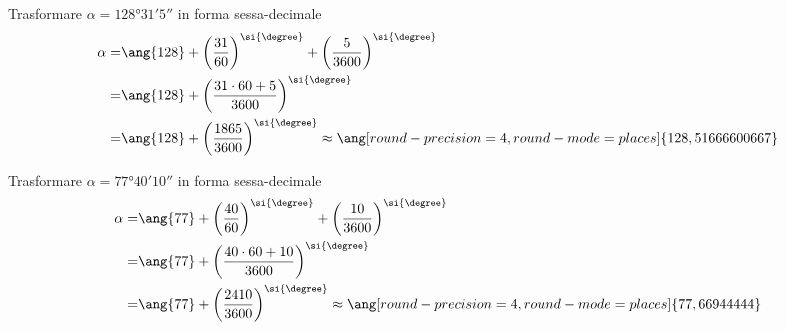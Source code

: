   \begin{exercise}
  	Trasformare  $\alpha=\ang{128;31;5}$ in forma sessa-decimale
  	\tcblower
  	\begin{align*}
  	\alpha=&\ang{128}+\left(\dfrac{31}{60}\right)^{\si{\degree} }+\left(\dfrac{5}{3600}\right)^{\si{\degree} }\\
  	=&\ang{128}+\left(\dfrac{31\cdot60+5}{3600}\right)^{\si{\degree}}\\
  	=&\ang{128}+\left(\dfrac{1865}{3600}\right)^{\si{\degree}}\approx\ang[round-precision=\lungarrotandamento,round-mode=places]{128,51666600667}
  	\end{align*}
  \end{exercise}
  \begin{exercise}
  	Trasformare  $\alpha=\ang{77;40;10}$ in forma sessa-decimale
  	\tcblower
  	\begin{align*}
  	\alpha=&\ang{77}+\left(\dfrac{40}{60}\right)^{\si{\degree} }+\left(\dfrac{10}{3600}\right)^{\si{\degree} }\\
  	=&\ang{77}+\left(\dfrac{40\cdot60+10}{3600}\right)^{\si{\degree}}\\
  	=&\ang{77}+\left(\dfrac{2410}{3600}\right)^{\si{\degree}}\approx\ang[round-precision=\lungarrotandamento,round-mode=places]{77,66944444}
  	\end{align*}
  \end{exercise}
